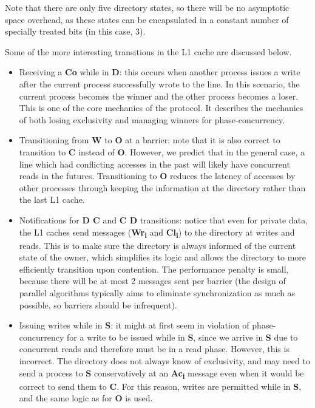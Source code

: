 \documentclass{article}
\begin{document}
Note that there are only five directory states, so there will be no asymptotic space overhead, as these states can be encapsulated in a constant number of specially treated bits (in this case, 3).

Some of the more interesting transitions in the L1 cache are discussed below.
\begin{itemize}
  \item Receiving a \textbf{Co} while in \textbf{D}: this occurs when another
  process issues a write after the current process successfully wrote to the line. In this scenario,
  the current process becomes the winner and the other process becomes a loser. This is one of the
  core mechanics of the protocol. It describes the mechanics of both losing
  exclusivity and managing winners for phase-concurrency.
  \item Transitioning from \textbf{W} to \textbf{O} at a barrier: note that it
  is also correct to transition to \textbf{C} instead of \textbf{O}. However,
  we predict that in the general case, a line which had conflicting accesses in
  the past will likely have concurrent reads in the futures. Transitioning
  to \textbf{O} reduces the latency of accesses by other processes through keeping the information at the directory rather than the last L1 cache.
  \item Notifications for \textbf{D \textrightarrow{} C} and
  \textbf{C \textrightarrow{} D} transitions: notice that even for private data,
  the L1 caches send messages (\textbf{Wr\textsubscript{i}} and \textbf{Cl\textsubscript{i}})
  to the directory at writes and reads. This is to
  make sure the directory is always informed of the current state of the owner,
  which simplifies its logic and allows the directory to more efficiently transition upon contention. The performance penalty is small, because there
  will be at most 2 messages sent per barrier (the design of parallel
  algorithms typically aims to eliminate synchronization as much as possible,
  so barriers should be infrequent).
  \item Issuing writes while in \textbf{S}: it might at first seem in violation
  of phase-concurrency for a write to be issued while in \textbf{S}, since we
  arrive in \textbf{S} due to concurrent reads and therefore must be in a
  read phase. However, this is incorrect. The directory does not always
  know of exclusivity, and may need to send a process to \textbf{S} conservatively
  at an \textbf{Ac\textsubscript{i}} message even when it would be correct to
  send them to \textbf{C}. For this reason, writes are permitted while in
  \textbf{S}, and the same logic as for \textbf{O} is used.
\end{itemize}
\end{document}
